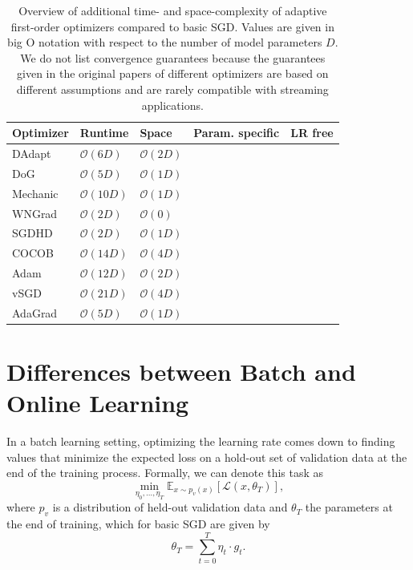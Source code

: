 \documentclass[letterpaper]{article} %
\newcommand{\cmark}{\ding{51}} %
\newcommand{\xmark}{\ding{55}} %
\begin{document}
\begin{table}[ht]
	\centering
	\small
	\begin{tabular}{@{}lllcc@{}}
		\toprule
		Optimizer & Runtime                         & Space             & Param. specific & LR free \\ \midrule
		DAdapt    & $\mathcal{O}(6D)$               & $\mathcal{O}(2D)$ & \xmark          & \cmark  \\
		DoG       & $\mathcal{O}(5D)$               & $\mathcal{O}(1D)$ & \xmark          & \cmark  \\
		Mechanic  & $\mathcal{O}(10D)$              & $\mathcal{O}(1D)$ & \xmark          & \cmark  \\
		WNGrad    & $\mathcal{O}(2D)$               & $\mathcal{O}(0)$  & \xmark          & \cmark  \\
		SGDHD     & $\mathcal{O}(2D)$               & $\mathcal{O}(1D)$ & \xmark          & \cmark  \\
		COCOB     & $\mathcal{O}(14D)$              & $\mathcal{O}(4D)$ & \cmark          & \cmark  \\
		Adam      & $\mathcal{O}(12D)$              & $\mathcal{O}(2D)$ & \cmark          & \xmark  \\
		vSGD      & $\mathcal{O}(21D)$\footnotemark & $\mathcal{O}(4D)$ & \cmark          & \cmark  \\ %
		AdaGrad   & $\mathcal{O}(5D)$               & $\mathcal{O}(1D)$ & \cmark          & \xmark  \\ \bottomrule
	\end{tabular}
	\caption{Overview of additional time- and space-complexity of adaptive first-order optimizers compared to basic SGD. Values are given in big O notation with respect to the number of model parameters $D$. We do not list convergence guarantees because the guarantees given in the original papers of different optimizers are based on different assumptions and are rarely compatible with streaming applications.}\label{tab:param_free_optims}
\end{table}

\section{Differences between Batch and Online Learning}

In a batch learning setting, optimizing the learning rate comes down to finding values that minimize the expected loss on a hold-out set of validation data at the end of the training process.
Formally, we can denote this task as
\begin{equation}
	\label{eq:batch_lr_optim}
	\min_{\eta_0, \ldots, \eta_T} \mathbb{E}_{x \sim p_v(x)}[\mathcal{L}(x, \theta_T)],
\end{equation}
where $p_v$ is a distribution of held-out validation data and $\theta_T$ the parameters at the end of training, which for basic SGD are given by
\begin{equation}
	\theta_T = \sum_{t=0}^{T} \eta_t \cdot g_t.
\end{equation}
\end{document}
